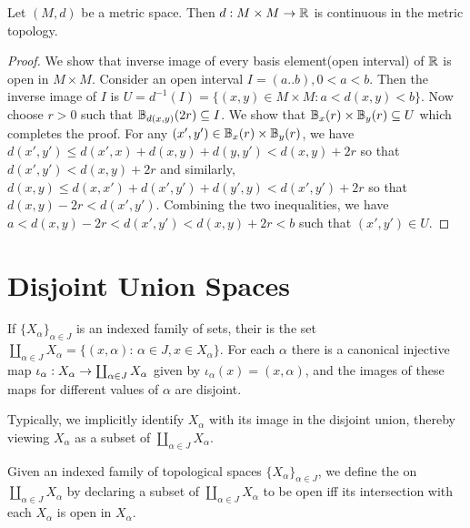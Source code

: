 \documentclass[11pt,a4paper]{article}
\begin{document}
\begin{prop}
Let $(M,d)$ be a metric space. Then $d:M\times M\rightarrow \mathbb{R}$ is continuous in the metric topology.
\end{prop}

\begin{proof}
We show that inverse image of every basis element(open interval) of $\mathbb{R}$ is open in $M\times M$. Consider an open interval $I = (a..b), 0<a<b$. Then the inverse image of $I$ is $U = d^{-1}(I) = \{(x,y)\in M\times M:a<d(x,y)<b\}$. Now choose $r>0$ such that $\mathbb{B}_{d(x,y)}(2r)\subseteq I$. We show that $\mathbb{B}_x(r)\times \mathbb{B}_y(r) \subseteq U$ which completes the proof. For any $(x',y')\in \mathbb{B}_x(r)\times \mathbb{B}_y(r)$, we have $d(x',y')\le d(x',x)+d(x,y)+d(y,y')<d(x,y)+2r$ so that $d(x',y')<d(x,y)+2r$ and similarly, $d(x,y)\le d(x,x')+d(x',y')+d(y',y)<d(x',y')+2r$ so that $d(x,y) - 2r < d(x',y')$. Combining the two inequalities, we have $a< d(x,y)-2r<d(x',y')<d(x,y)+2r<b$ such that $(x',y')\in U$. 
\end{proof}

\section{Disjoint Union Spaces}

\begin{mydef}
If $\{X_\alpha\}_{\alpha\in J}$ is an indexed family of sets, their  is the set $\coprod_{\alpha\in J}X_\alpha = \{(x,\alpha):\,\alpha \in J, x\in X_\alpha\}$. For each $\alpha$ there is a canonical injective map $\iota_\alpha:X_\alpha\rightarrow \coprod_{\alpha\in J}X_\alpha$ given by $\iota_\alpha(x) = (x,\alpha)$, and the images of these maps for different values of $\alpha$ are disjoint. 
\end{mydef}

Typically, we implicitly identify $X_\alpha$ with its image in the disjoint union, thereby viewing $X_\alpha$ as a subset of $\coprod_{\alpha\in J}X_\alpha$. 

\begin{mydef}\label{def:disjoint_union_topology}
Given an indexed family of topological spaces $\{X_\alpha\}_{\alpha\in J}$, we define the  on $\coprod_{\alpha\in J}X_\alpha$ by declaring a subset of $\coprod_{\alpha\in J}X_\alpha$ to be open iff its intersection with each $X_\alpha$ is open in $X_\alpha$.
\end{mydef}
\end{document}
